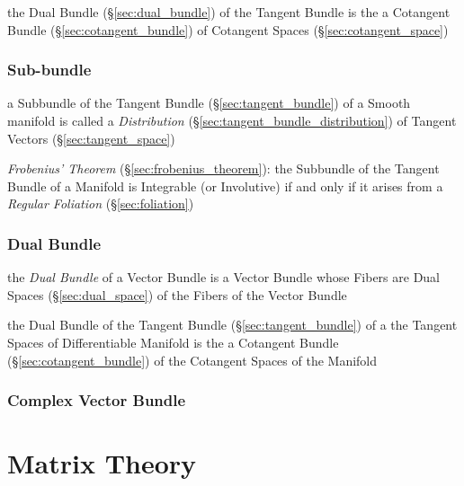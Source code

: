 the Dual Bundle (\S\ref{sec:dual_bundle}) of the Tangent Bundle is the
a Cotangent Bundle (\S\ref{sec:cotangent_bundle}) of
Cotangent Spaces (\S\ref{sec:cotangent_space})



\subsubsection{Sub-bundle}\label{sec:subbundle}

\fist a Subbundle of the Tangent Bundle (\S\ref{sec:tangent_bundle}) of a
Smooth manifold is called a \emph{Distribution}
(\S\ref{sec:tangent_bundle_distribution}) of Tangent Vectors
(\S\ref{sec:tangent_space})


\emph{Frobenius' Theorem} (\S\ref{sec:frobenius_theorem}): the Subbundle of the
Tangent Bundle of a Manifold is Integrable (or Involutive) if and only if it
arises from a \emph{Regular Foliation} (\S\ref{sec:foliation})



\subsubsection{Dual Bundle}\label{sec:dual_vectorbundle}

the \emph{Dual Bundle} of a Vector Bundle is a Vector Bundle whose Fibers are
Dual Spaces (\S\ref{sec:dual_space}) of the Fibers of the Vector Bundle

the Dual Bundle of the Tangent Bundle (\S\ref{sec:tangent_bundle}) of a the
Tangent Spaces of Differentiable Manifold is the a Cotangent Bundle
(\S\ref{sec:cotangent_bundle}) of the Cotangent Spaces of the Manifold



\subsubsection{Complex Vector Bundle}\label{sec:complex_vector_bundle}



\section{Matrix Theory}\label{sec:matrix_theory}



